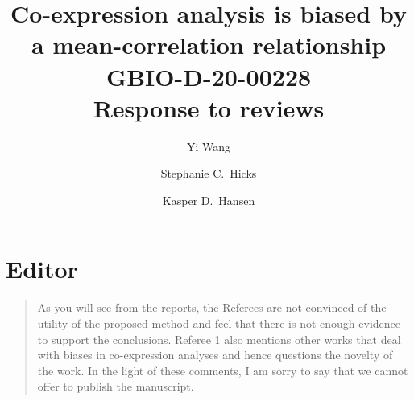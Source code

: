 \documentclass[english,letterpaper,pdftex,12pt]{article}
\begin{document}
\title{
Co-expression analysis is biased by a mean-correlation relationship \\
GBIO-D-20-00228\\
\vspace*{1cm}
Response to reviews
}
\author{Yi Wang \and Stephanie C.\ Hicks \and Kasper D.\ Hansen}
\date{}

\maketitle

\clearpage

\section*{Editor}

\begin{quote}
  As you will see from the reports, the Referees are not convinced of the utility of the proposed method and feel that there is not enough evidence to support the conclusions. Referee 1 also mentions other works that deal with biases in co-expression analyses and hence questions the novelty of the work. In the light of these comments, I am sorry to say that we cannot offer to publish the manuscript. 
\end{quote}
\end{document}
